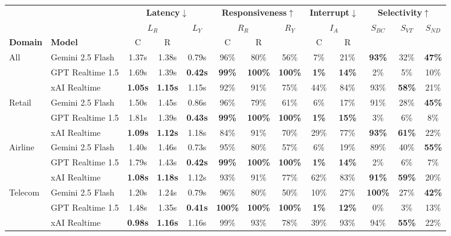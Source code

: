 \begin{tabular}{@{}ll|cc|c|cc|c|cc|ccc@{}}
\toprule
 & & \multicolumn{3}{c|}{\textbf{Latency}$\downarrow$} & \multicolumn{3}{c|}{\textbf{Responsiveness}$\uparrow$} & \multicolumn{2}{c|}{\textbf{Interrupt}$\downarrow$} & \multicolumn{3}{c}{\textbf{Selectivity}$\uparrow$} \\
 & & \multicolumn{2}{c|}{$L_R$} & \multirow{2}{*}{$L_Y$} & \multicolumn{2}{c|}{$R_R$} & \multirow{2}{*}{$R_Y$} & \multicolumn{2}{c|}{$I_A$} & \multirow{2}{*}{$S_{BC}$} & \multirow{2}{*}{$S_{VT}$} & \multirow{2}{*}{$S_{ND}$} \\
\textbf{Domain} & \textbf{Model} & C & R & & C & R & & C & R & & & \\
\midrule
\multirow{3}{*}{All} & Gemini 2.5 Flash & 1.37s & 1.38s & 0.79s & 96\% & 80\% & 56\% & 7\% & 21\% & \textbf{93\%} & 32\% & \textbf{47\%} \\
 & GPT Realtime 1.5 & 1.69s & 1.39s & \textbf{0.42s} & \textbf{99\%} & \textbf{100\%} & \textbf{100\%} & \textbf{1\%} & \textbf{14\%} & 2\% & 5\% & 10\% \\
 & xAI Realtime & \textbf{1.05s} & \textbf{1.15s} & 1.15s & 92\% & 91\% & 75\% & 44\% & 84\% & 93\% & \textbf{58\%} & 21\% \\
\midrule
\multirow{3}{*}{Retail} & Gemini 2.5 Flash & 1.50s & 1.45s & 0.86s & 96\% & 79\% & 61\% & 6\% & 17\% & 91\% & 28\% & \textbf{45\%} \\
 & GPT Realtime 1.5 & 1.81s & 1.39s & \textbf{0.43s} & \textbf{99\%} & \textbf{100\%} & \textbf{100\%} & \textbf{1\%} & \textbf{15\%} & 3\% & 6\% & 8\% \\
 & xAI Realtime & \textbf{1.09s} & \textbf{1.12s} & 1.18s & 84\% & 91\% & 70\% & 29\% & 77\% & \textbf{93\%} & \textbf{61\%} & 22\% \\
\midrule
\multirow{3}{*}{Airline} & Gemini 2.5 Flash & 1.40s & 1.46s & 0.73s & 95\% & 80\% & 57\% & 6\% & 19\% & 89\% & 40\% & \textbf{55\%} \\
 & GPT Realtime 1.5 & 1.79s & 1.43s & \textbf{0.42s} & \textbf{99\%} & \textbf{100\%} & \textbf{100\%} & \textbf{1\%} & \textbf{14\%} & 2\% & 6\% & 7\% \\
 & xAI Realtime & \textbf{1.08s} & \textbf{1.18s} & 1.12s & 93\% & 91\% & 77\% & 62\% & 83\% & \textbf{91\%} & \textbf{59\%} & 20\% \\
\midrule
\multirow{3}{*}{Telecom} & Gemini 2.5 Flash & 1.20s & 1.24s & 0.79s & 96\% & 80\% & 50\% & 10\% & 27\% & \textbf{100\%} & 27\% & \textbf{42\%} \\
 & GPT Realtime 1.5 & 1.48s & 1.35s & \textbf{0.41s} & \textbf{100\%} & \textbf{100\%} & \textbf{100\%} & \textbf{1\%} & \textbf{12\%} & 0\% & 3\% & 13\% \\
 & xAI Realtime & \textbf{0.98s} & \textbf{1.16s} & 1.16s & 99\% & 93\% & 78\% & 39\% & 93\% & 94\% & \textbf{55\%} & 22\% \\
\bottomrule
\end{tabular}